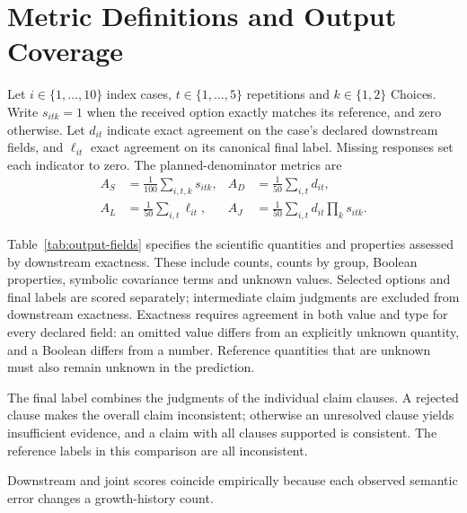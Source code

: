\section{Metric Definitions and Output Coverage}
\label{app:metrics}

Let $i\in\{1,\ldots,10\}$ index cases, $t\in\{1,\ldots,5\}$ repetitions and $k\in\{1,2\}$ Choices. Write $s_{itk}=1$ when the received option exactly matches its reference, and zero otherwise. Let $d_{it}$ indicate exact agreement on the case's declared downstream fields, and $\ell_{it}$ exact agreement on its canonical final label. Missing responses set each indicator to zero. The planned-denominator metrics are
\begin{align}
 A_S &= \frac{1}{100}\sum_{i,t,k}s_{itk}, & A_D &= \frac{1}{50}\sum_{i,t}d_{it}, \\
 A_L &= \frac{1}{50}\sum_{i,t}\ell_{it}, & A_J &= \frac{1}{50}\sum_{i,t}d_{it}\prod_k s_{itk}.
\end{align}

Table~\ref{tab:output-fields} specifies the scientific quantities and properties assessed by downstream exactness. These include counts, counts by group, Boolean properties, symbolic covariance terms and unknown values. Selected options and final labels are scored separately; intermediate claim judgments are excluded from downstream exactness. Exactness requires agreement in both value and type for every declared field: an omitted value differs from an explicitly unknown quantity, and a Boolean differs from a number. Reference quantities that are unknown must also remain unknown in the prediction.

The final label combines the judgments of the individual claim clauses. A rejected clause makes the overall claim inconsistent; otherwise an unresolved clause yields insufficient evidence, and a claim with all clauses supported is consistent. The reference labels in this comparison are all inconsistent.

Downstream and joint scores coincide empirically because each observed semantic error changes a growth-history count.

